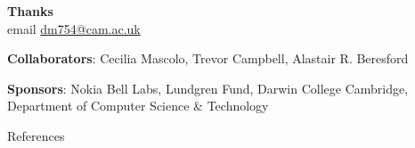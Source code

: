 \documentclass[hyperref={colorlinks = true},unknownkeysallowed]{beamer}
\begin{document}



\begin{frame}
	\Large{\textbf{Thanks} \\ email \href{mailto:dm754@cam.ac.uk}{dm754@cam.ac.uk}  }
	\item \textbf{Collaborators}: Cecilia Mascolo, Trevor Campbell, Alastair R. Beresford
	\item \textbf{Sponsors}: Nokia Bell Labs, Lundgren Fund, Darwin College Cambridge, Department of Computer Science \& Technology
\end{frame}

\begin{frame}[allowframebreaks]{References}
	\tiny %
	
\end{frame}
\end{document}

